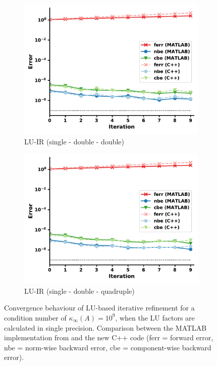 \begin{figure}[h]
\centering
\begin{subfigure}{.5\textwidth}
  \centering
  \includegraphics[width=\linewidth]{chapters/5_experiments/figures/LUsdd.pdf}
  \caption{LU-IR (single - double - double)}
  \label{fig:lusdd}
\end{subfigure}%
\begin{subfigure}{.5\textwidth}
  \centering
  \includegraphics[width=\linewidth]{chapters/5_experiments/figures/LUsdq.pdf}
  \caption{LU-IR (single - double - quadruple)}
  \label{fig:lusdq}
\end{subfigure}
\caption[LU-based IR (single precision factorization)]{Convergence behaviour of LU-based iterative refinement for a condition number of $\kappa_\infty (A)=10^9$, when the LU factors are calculated in single precision. Comparison between the MATLAB implementation from \cite{carson_new_2017} and the new C++ code (ferr = forward error, nbe = norm-wise backward error, cbe = component-wise backward error).}
\label{fig:lu_ir3}
\end{figure}

